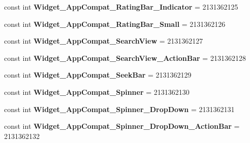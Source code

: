\begin{DoxyCompactItemize}
const int {\bfseries Widget\+\_\+\+App\+Compat\+\_\+\+Rating\+Bar\+\_\+\+Indicator} = 2131362125
\item 
\mbox{\label{class_sample_app_1_1_droid_1_1_resource_1_1_style_aab6538b7bd6a4c70fca741b0822463cd}} 
const int {\bfseries Widget\+\_\+\+App\+Compat\+\_\+\+Rating\+Bar\+\_\+\+Small} = 2131362126
\item 
\mbox{\label{class_sample_app_1_1_droid_1_1_resource_1_1_style_a7b4e68ad26fb74f8a05f571e93537501}} 
const int {\bfseries Widget\+\_\+\+App\+Compat\+\_\+\+Search\+View} = 2131362127
\item 
\mbox{\label{class_sample_app_1_1_droid_1_1_resource_1_1_style_a6917eb3c2104585d399bd68f285137d1}} 
const int {\bfseries Widget\+\_\+\+App\+Compat\+\_\+\+Search\+View\+\_\+\+Action\+Bar} = 2131362128
\item 
\mbox{\label{class_sample_app_1_1_droid_1_1_resource_1_1_style_acf5ca16192537179c5c92ce9343922e1}} 
const int {\bfseries Widget\+\_\+\+App\+Compat\+\_\+\+Seek\+Bar} = 2131362129
\item 
\mbox{\label{class_sample_app_1_1_droid_1_1_resource_1_1_style_a18ab5e426da862dfea3270df42121d94}} 
const int {\bfseries Widget\+\_\+\+App\+Compat\+\_\+\+Spinner} = 2131362130
\item 
\mbox{\label{class_sample_app_1_1_droid_1_1_resource_1_1_style_a8a89caff4450a137ed4cb0fe1789c937}} 
const int {\bfseries Widget\+\_\+\+App\+Compat\+\_\+\+Spinner\+\_\+\+Drop\+Down} = 2131362131
\item 
\mbox{\label{class_sample_app_1_1_droid_1_1_resource_1_1_style_ad26d12b1d7a2a084948e7b53166fda50}} 
const int {\bfseries Widget\+\_\+\+App\+Compat\+\_\+\+Spinner\+\_\+\+Drop\+Down\+\_\+\+Action\+Bar} = 2131362132
\item 
\mbox{\label{class_sample_app_1_1_droid_1_1_resource_1_1_style_ac5171e5d0e8e02a97900813a34b9dcd7}} 

\end{DoxyCompactItemize}
